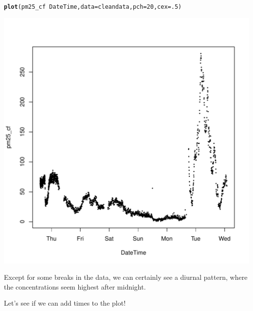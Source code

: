 \documentclass{article}\usepackage[]{graphicx}\usepackage[]{color}
\makeatletter
\def\maxwidth{ %
  \ifdim\Gin@nat@width>\linewidth
    \linewidth
  \else
    \Gin@nat@width
  \fi
}
\newcommand{\hlnum}[1]{\textcolor[rgb]{0.686,0.059,0.569}{#1}}%
\newcommand{\hlopt}[1]{\textcolor[rgb]{0,0,0}{#1}}%
\newcommand{\hlstd}[1]{\textcolor[rgb]{0.345,0.345,0.345}{#1}}%
\newcommand{\hlkwc}[1]{\textcolor[rgb]{0.333,0.667,0.333}{#1}}%
\newcommand{\hlkwd}[1]{\textcolor[rgb]{0.737,0.353,0.396}{\textbf{#1}}}%
\newenvironment{kframe}{%
 \def\at@end@of@kframe{}%
 \ifinner\ifhmode%
  \def\at@end@of@kframe{\end{minipage}}%
  \begin{minipage}{\columnwidth}%
 \fi\fi%
 \def\FrameCommand##1{\hskip\@totalleftmargin \hskip-\fboxsep
 \colorbox{shadecolor}{##1}\hskip-\fboxsep
     \hskip-\linewidth \hskip-\@totalleftmargin \hskip\columnwidth}%
 \MakeFramed {\advance\hsize-\width
   \@totalleftmargin\z@ \linewidth\hsize
   \@setminipage}}%
 {\par\unskip\endMakeFramed%
 \at@end@of@kframe}
\newenvironment{knitrout}{}{} %
\def\maxwidth{ %
  \ifdim\Gin@nat@width>\linewidth
    \linewidth
  \else
    \Gin@nat@width
  \fi
}
\makeatother
\begin{document}
\begin{knitrout}
\color{fgcolor}\begin{kframe}
\begin{alltt}
\hlkwd{plot}\hlstd{(pm25_cf}\hlopt{~}\hlstd{DateTime,} \hlkwc{data}\hlstd{=cleandata,} \hlkwc{pch}\hlstd{=}\hlnum{20}\hlstd{,} \hlkwc{cex}\hlstd{=}\hlnum{.5}\hlstd{)}
\end{alltt}
\end{kframe}
\includegraphics[width=\maxwidth]{figure/unnamed-chunk-4-1} 

\end{knitrout}

Except for some breaks in the data, we can certainly see a diurnal pattern, where the concentrations seem highest after midnight. 

Let's see if we can add times to the plot!
\end{document}
